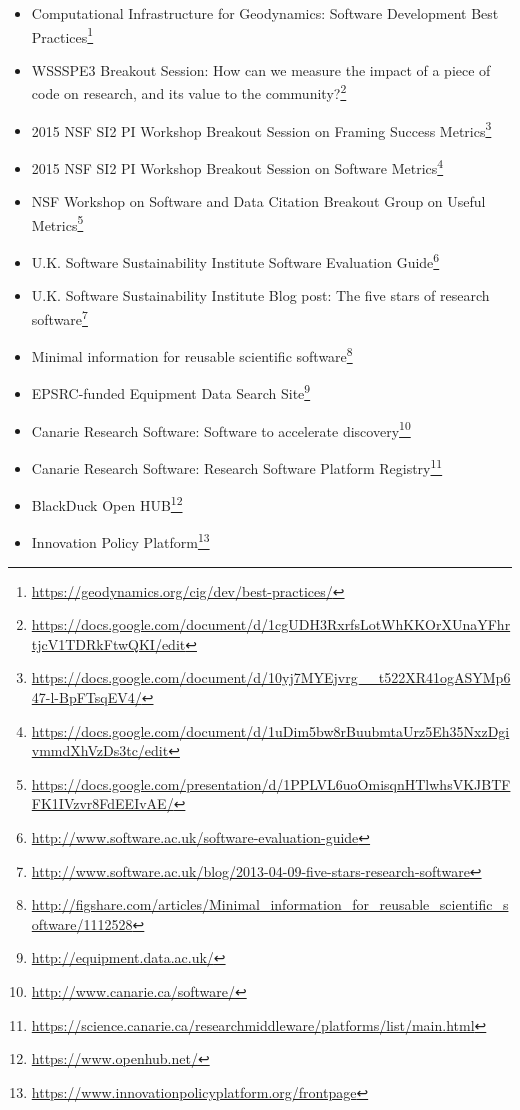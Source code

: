 \begin{itemize}

\item Computational Infrastructure for Geodynamics: Software Development Best
Practices\footnote{\url{https://geodynamics.org/cig/dev/best-practices/}}

\item WSSSPE3 Breakout Session: How can we measure the impact of a piece of code on
research, and its value to the
community?\footnote{\url{https://docs.google.com/document/d/1cgUDH3RxrfsLotWhKKOrXUnaYFhrtjcV1TDRkFtwQKI/edit}}

\item 2015 NSF SI2 PI Workshop Breakout Session on Framing Success
Metrics\footnote{\url{https://docs.google.com/document/d/10yj7MYEjvrg__t522XR41ogASYMp647-l-BpFTsqEV4/}}

\item 2015 NSF SI2 PI Workshop Breakout Session on Software
Metrics\footnote{\url{https://docs.google.com/document/d/1uDim5bw8rBuubmtaUrz5Eh35NxzDgivmmdXhVzDs3tc/edit}}

\item NSF Workshop on Software and Data Citation Breakout Group on Useful
Metrics\footnote{\url{https://docs.google.com/presentation/d/1PPLVL6uoOmisqnHTlwhsVKJBTFFK1IVzvr8FdEEIvAE/}}

\item U.K. Software Sustainability Institute Software Evaluation
Guide\footnote{\url{http://www.software.ac.uk/software-evaluation-guide}}

\item U.K. Software Sustainability Institute Blog post: The five stars of
research
software\footnote{\url{http://www.software.ac.uk/blog/2013-04-09-five-stars-research-software}}

\item Minimal information for reusable scientific
software\footnote{\url{http://figshare.com/articles/Minimal_information_for_reusable_scientific_software/1112528}}

\item EPSRC-funded Equipment Data Search
Site\footnote{\url{http://equipment.data.ac.uk/}}

\item Canarie Research Software: Software to accelerate
discovery\footnote{\url{http://www.canarie.ca/software/}}

\item Canarie Research Software: Research Software Platform
Registry\footnote{\url{https://science.canarie.ca/researchmiddleware/platforms/list/main.html}}

\item BlackDuck Open HUB\footnote{\url{https://www.openhub.net/}}
\item Innovation Policy
Platform\footnote{\url{https://www.innovationpolicyplatform.org/frontpage}}


\end{itemize}


